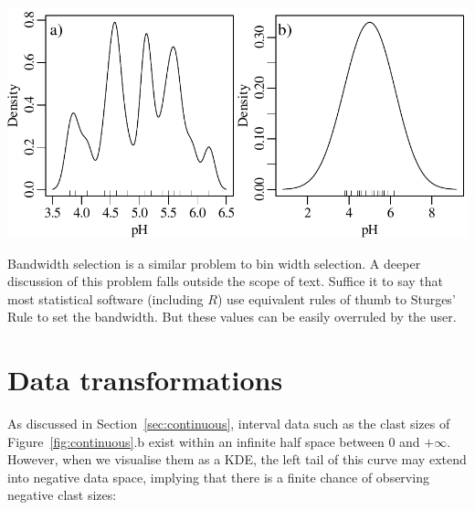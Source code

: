 \noindent\begin{minipage}[t][][b]{.6\textwidth}
  \includegraphics[width=\textwidth]{../figures/bandwidth.pdf}\medskip
\end{minipage}
\begin{minipage}[t][][t]{.4\textwidth}
\end{minipage}

Bandwidth selection is a similar problem to bin width selection.  A
deeper discussion of this problem falls outside the scope of text.
Suffice it to say that most statistical software (including $R$) use
equivalent rules of thumb to Sturges' Rule to set the bandwidth.  But
these values can be easily overruled by the user.

\section{Data transformations}
\label{sec:transformations}

As discussed in Section~\ref{sec:continuous}, interval data such as
the clast sizes of Figure~\ref{fig:continuous}.b exist within an
infinite half space between 0 and $+\infty$. However, when we
visualise them as a KDE, the left tail of this curve may extend into
negative data space, implying that there is a finite chance of
observing negative clast sizes:


